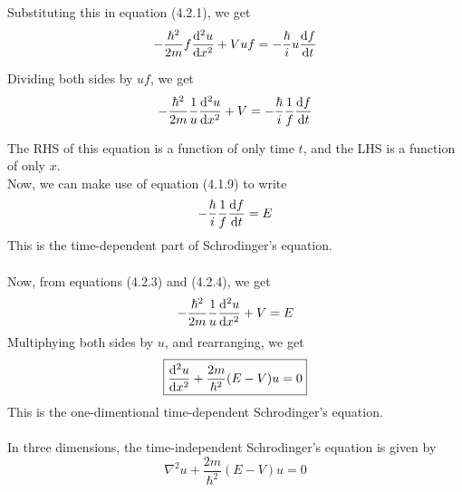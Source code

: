\documentclass[12pt]{article}
\numberwithin{equation}{subsection}
\begin{document}
Substituting this in equation (4.2.1), we get
\begin{equation}
    -\frac{\hbar^2}{2m} f \dv[2]{u}{x} + Vuf = -\frac{\hbar}{i} u \dv{f}{t}
\end{equation}

Dividing both sides by $uf$, we get
\begin{equation}
    -\frac{\hbar^2}{2m} \frac{1}{u} \dv[2]{u}{x} + V = -\frac{\hbar}{i} \frac{1}{f} \dv{f}{t}
\end{equation}

The RHS of this equation is a function of only time $t$, and the LHS is a function of only $x$. \\
Now, we can make use of equation (4.1.9) to write
\begin{equation}
    -\frac{\hbar}{i} \frac{1}{f} \dv{f}{t} = E
\end{equation}
This is the time-dependent part of Schrodinger's equation.\\~\\
Now, from equations (4.2.3) and (4.2.4), we get
\begin{equation}
    -\frac{\hbar^2}{2m} \frac{1}{u} \dv[2]{u}{x} + V = E
\end{equation}
Multiphying both sides by $u$, and rearranging, we get
\begin{equation}
    \boxed{ \dv[2]{u}{x} + \frac{2m}{\hbar^2} (E-V)u = 0 }
\end{equation}
This is the one-dimentional time-dependent Schrodinger's equation.\\~\\
In three dimensions, the time-independent Schrodinger's equation is given by
\begin{equation}
    \boxed{ \nabla^2 u + \frac{2m}{\hbar^2} (E-V)u = 0 }
\end{equation}
\end{document}
